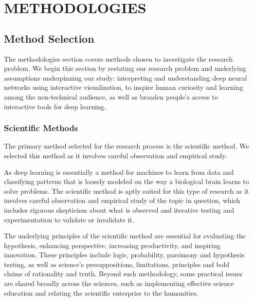 \chapter{METHODOLOGIES}

\graphicspath{ {./methodologies/} }
\thispagestyle{empty}


\section{Method Selection}

The methodologies section covers methods chosen to investigate the research problem. We begin this section by restating our research problem and underlying assumptions underpinning our study: interpreting and understanding deep neural networks using interactive visualization, to inspire human curiosity and learning among the non-technical audience, as well as broaden people's access to interactive tools for deep learning.

\subsection{Scientific Methods}

The primary method selected for the research process is the scientific method. We selected this method as it involves careful observation and empirical study.

As deep learning is essentially a method for machines to learn from data and classifying patterns that is loosely modeled on the way a biological brain learns to solve problems. The scientific method is aptly suited for this type of research as it involves careful observation and empirical study of the topic in question, which includes rigorous skepticism about what is observed and iterative testing and experimentation to validate or invalidate it.

The underlying principles of the scientific method \cite{gauch_jr_2012} are essential for evaluating the hypothesis, enhancing perspective, increasing productivity, and inspiring innovation. These principles include logic, probability, parsimony and hypothesis testing, as well as science's presuppositions, limitations, principles and bold claims of rationality and truth. Beyond such methodology, some practical issues are shared broadly across the sciences, such as implementing effective science education and relating the scientific enterprise to the humanities.

